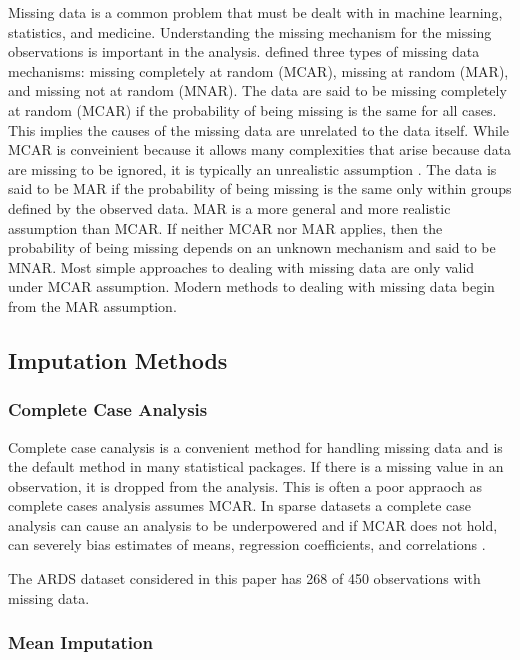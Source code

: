 \documentclass[12pt,]{article}
\begin{document}
Missing data is a common problem that must be dealt with in machine
learning, statistics, and medicine. Understanding the missing mechanism
for the missing observations is important in the analysis.
\autocite{rubin_inference_1976} defined three types of missing data
mechanisms: missing completely at random (MCAR), missing at random
(MAR), and missing not at random (MNAR). The data are said to be missing
completely at random (MCAR) if the probability of being missing is the
same for all cases. This implies the causes of the missing data are
unrelated to the data itself. While MCAR is conveinient because it
allows many complexities that arise because data are missing to be
ignored, it is typically an unrealistic assumption
\autocite{van_buuren_flexible_2012}. The data is said to be MAR if the
probability of being missing is the same only within groups defined by
the observed data. MAR is a more general and more realistic assumption
than MCAR. If neither MCAR nor MAR applies, then the probability of
being missing depends on an unknown mechanism and said to be MNAR. Most
simple approaches to dealing with missing data are only valid under MCAR
assumption. Modern methods to dealing with missing data begin from the
MAR assumption.

\subsection{Imputation Methods}\label{imputation-methods}

\subsubsection{Complete Case Analysis}\label{complete-case-analysis}

Complete case canalysis is a convenient method for handling missing data
and is the default method in many statistical packages. If there is a
missing value in an observation, it is dropped from the analysis. This
is often a poor appraoch as complete cases analysis assumes MCAR. In
sparse datasets a complete case analysis can cause an analysis to be
underpowered and if MCAR does not hold, can severely bias estimates of
means, regression coefficients, and correlations
\autocite{van_buuren_flexible_2012}.

The ARDS dataset considered in this paper has 268 of 450 observations
with missing data.

\subsubsection{Mean Imputation}\label{mean-imputation}
\end{document}
